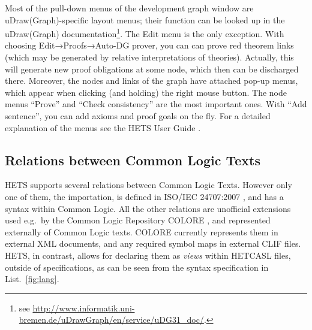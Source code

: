 \documentclass{article}
\newcommand{\normalTEXTSC}[2]{{#1\scriptsize#2}}
\newcommand     {\Hets}{\normalTEXTSC{H}{ETS}\xspace}
\newcommand{\HetCASL}{\normalTEXTSC{H}{ET}\normalTEXTSC{C}{ASL}\xspace}
\begin{document}
Most of the pull-down menus of the development graph window are
uDraw(Graph)-specific layout menus; their function can be looked up in
the uDraw(Graph) documentation\footnote{see
  \url{http://www.informatik.uni-bremen.de/uDrawGraph/en/service/uDG31\_doc/}.}.
The Edit menu is the only exception. 
With choosing Edit→Proofs→Auto-DG prover, you can can prove red theorem
links (which may be generated by relative interpretations of theories).
Actually, this will generate new proof obligations at some node,
which then can be discharged there.
Moreover, the nodes and links of the
graph have attached pop-up menus, which appear when clicking (and
holding) the right mouse button. 
The node menus ``Prove'' and ``Check consistency'' are the most
important ones. With ``Add sentence'', you can add axioms and
proof goals on the fly.
For a detailed explanation of the menus
see the \Hets User Guide \cite{HetsUserGuide}.

\subsection{Relations between Common Logic Texts}
\label{relationsInCL}
\Hets supports several relations between Common Logic Texts. However only one of
them, the importation, is defined in ISO/IEC 24707:2007 \cite{CommonLogic:oldfashioned}, and has a syntax within Common Logic. All the other relations are 
unofficial extensions used e.g.\ by the Common Logic Repository COLORE \cite{Colore}, and represented externally of Common Logic texts.  COLORE currently represents them in external XML documents, and any required symbol maps in external CLIF files.  \Hets, in contrast, allows for declaring them as \emph{views} within \HetCASL files, outside of specifications, as can be seen from the syntax specification in List.~\ref{fig:lang}.
\end{document}
